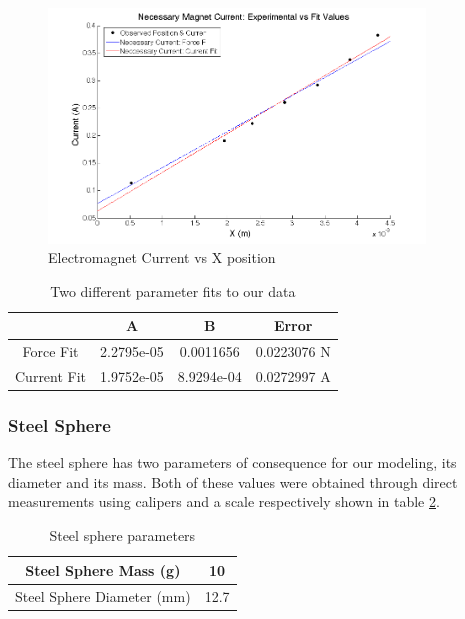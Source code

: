 \documentclass{article}
\theoremstyle{plain}
\theoremstyle{definition}
\theoremstyle{remark}
\begin{document}
\begin{figure}
\begin{center}
\includegraphics[width = 10cm]{magnetDataFits.png}
\caption{Electromagnet Current vs X position}
\label{Q1_d3}
\end{center}
\end{figure}

\begin{table}
\begin{center}
    \begin{tabular}{|c|c|c|c|}
        \hline
        ~           & A          & B         &  Error \\ \hline
        Force Fit   & 2.2795e-05 & 0.0011656  & 0.0223076 N \\ 
        Current Fit & 1.9752e-05 & 8.9294e-04 & 0.0272997 A\\
        \hline
    \end{tabular}
\caption{Two different parameter fits to our data}
\label{Q1_dt2}
\end{center}
\end{table}

\subsubsection*{Steel Sphere}
The steel sphere has two parameters of consequence for our modeling, its diameter and its mass.  Both of these values were obtained through direct measurements using calipers and a scale respectively shown in table \ref{Q1_dt3}.

\begin{table}[hbt]
\begin{center}
    \begin{tabular}{|c|c|}
        \hline
        Steel Sphere Mass (g)      & 10   \\ \hline
        Steel Sphere Diameter (mm) & 12.7 \\
        \hline
    \end{tabular}
\caption{Steel sphere parameters}
\label{Q1_dt3}
\end{center}
\end{table}
\end{document}
